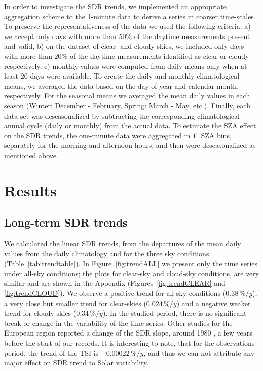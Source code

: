\documentclass[applsci,article,submit,moreauthors,pdftex]{Definitions/mdpi}
\begin{document}
In order to investigate the SDR trends, we implemented an appropriate
aggregation scheme to the 1-minute data to derive a series in coarser
time-scales. To preserve the representativeness of the data we used the
following criteria: a) we accept only days with more than 50\% of the
daytime measurements present and valid, b) on the dataset of clear- and
cloudy-skies, we included only days with more than 20\% of the daytime
measurements identified as clear or cloudy respectively, c) monthly
values were computed from daily means only when at least 20 days were
available. To create the daily and monthly climatological means, we
averaged the data based on the day of year and calendar month,
respectively. For the seasonal means we averaged the mean daily values
in each season (Winter: December - February, Spring: March - May, etc.).
Finally, each data set was deseasonalized by subtracting the
corresponding climatological annual cycle (daily or monthly) from the
actual data. To estimate the SZA effect on the SDR trends, the
one-minute data were aggregated in \(1^\circ\) SZA bins, separately for
the morning and afternoon hours, and then were deseasonalized as
mentioned above.

\hypertarget{results}{%
\section{Results}\label{results}}

\hypertarget{long-term-sdr-trends}{%
\subsection{Long-term SDR trends}\label{long-term-sdr-trends}}

We calculated the linear SDR trends, from the departures of the mean
daily values from the daily climatology and for the three sky conditions
(Table~\ref{tab:trendtable}). In Figure~\ref{fig:trendALL} we present
only the time series under all-sky conditions; the plots for clear-sky
and cloud-sky conditions, are very similar and are shown in the Appendix
(Figures~\ref{fig:trendCLEAR} and~ \ref{fig:trendCLOUD}). We observe a
positive trend for all-sky conditions (\(0.38\,\%/y\)), a very close but
smaller trend for clear-skies (\(0.024\,\%/y\)) and a negative weaker
trend for cloudy-skies (\(0.34\,\%/y\)). In the studied period, there is
no significant break or change in the variability of the time series.
Other studies for the European region reported a change of the SDR
slope, around 1980 \citep{Wild2021, Yuan2021, Ohmura2009}, a few years
before the start of our records. It is interesting to note, that for the
observations period, the trend of the TSI is \(-0.00022\,\%/y\), and
thus we can not attribute any major effect on SDR trend to Solar
variability.
\end{document}
